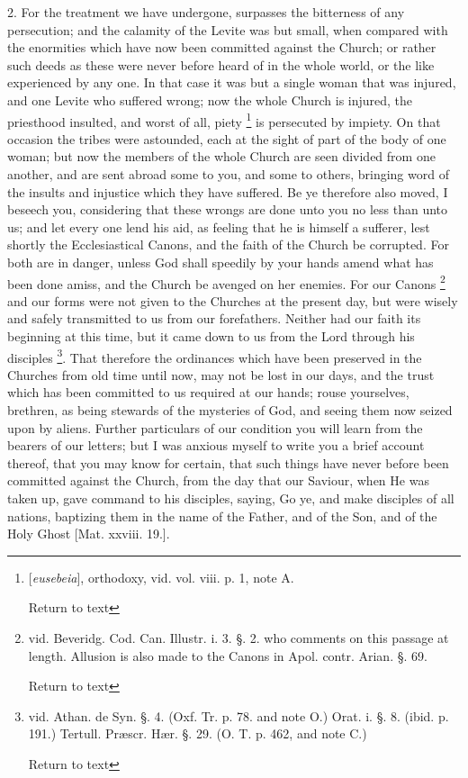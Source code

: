 2. For the treatment we have undergone, surpasses
the bitterness of any persecution; and the calamity of the Levite was
but small, when compared with the enormities which have now been
committed against the Church; or rather such deeds as these were
never before heard of in the whole world, or the like experienced by
any one. In that case it was but a single woman that was injured, and
one Levite who suffered wrong; now the whole Church is injured, the
priesthood insulted, and worst of all, piety \footnote{[\emph{eusebeia}], orthodoxy, vid. vol. viii. p. 1, note A.

Return to text} is persecuted by impiety. On that occasion the tribes were
astounded, each at the sight of part of the body of one woman; but now
the members of the whole Church are seen divided from one another, and
are sent abroad some to you, and some to others, bringing word of the
insults and injustice which they have suffered. Be ye therefore also
moved, I beseech you, considering that these wrongs are done unto you
no less than unto us; and let every one lend his aid, as feeling that
he is himself a sufferer, lest shortly the Ecclesiastical Canons, and
the faith of the Church be corrupted. For both are in danger, unless
God shall speedily by your hands amend what has been done amiss, and
the Church be avenged on her enemies. For our Canons \footnote{vid. Beveridg. Cod. Can. Illustr. i. 3. §. 2.
who comments on this passage at length. Allusion is also made to the
Canons in Apol. contr. Arian. §. 69.

Return to text} and our forms were not given to the Churches at the present
day, but were wisely and safely transmitted to us from our
forefathers. Neither had our faith its beginning at this time, but it
came down to us from the Lord through his disciples \footnote{vid. Athan. de Syn. §. 4. (Oxf. Tr. p. 78. and note O.) Orat. i. §.
8. (ibid. p. 191.) Tertull. Præscr. Hær. §. 29. (O. T. p. 462, and
note C.)

Return to text}. That therefore the ordinances which have been preserved in the
Churches from old time until now, may not be lost in our days, and the
trust which has been committed to us required at our hands; rouse
yourselves, brethren, as being stewards of the mysteries of God, and
seeing them now seized upon by aliens. Further particulars of our
condition you will learn from the bearers of our letters; but I was
anxious myself to write you a brief account thereof, that you may know
for certain, that such things have never before been committed against
the Church, from the day that our Saviour, when He was taken up, gave
command to his disciples, saying, Go ye, and make disciples of all
nations, baptizing them in the name of the Father, and of the Son, and
of the Holy Ghost [Mat. xxviii. 19.].

